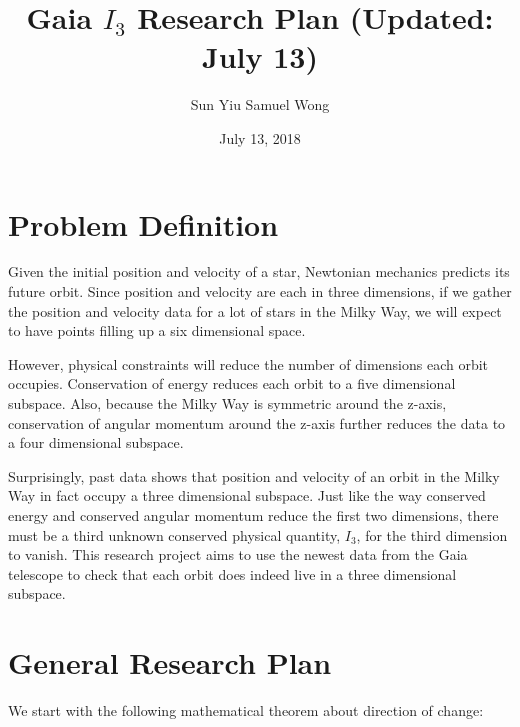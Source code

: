 \documentclass[12pt]{article}
\begin{document}
\title{Gaia $I_3$ Research Plan (Updated: July 13)}
\author{Sun Yiu Samuel Wong}
\date{July 13, 2018}
\maketitle

\newtheorem{theorem}{Theorem}
\newtheorem{assumption}{Assumption}
\newtheorem*{hypothesis}{Hypothesis}

\section{Problem Definition}
Given the initial position and velocity of a star, Newtonian mechanics predicts its future orbit. Since position and velocity are each in three dimensions, if we gather the position and velocity data for a lot of stars in the Milky Way, we will expect to have points filling up a six dimensional space.

However, physical constraints will reduce the number of dimensions each orbit occupies. Conservation of energy reduces each orbit to a five dimensional subspace. Also, because the Milky Way is symmetric around the z-axis, conservation of angular momentum around the z-axis further reduces the data to a four dimensional subspace.

Surprisingly, past data shows that position and velocity of an orbit in the Milky Way in fact occupy a three dimensional subspace. Just like the way conserved energy and conserved angular momentum reduce the first two dimensions, there must be a third unknown conserved physical quantity, $I_3$, for the third dimension to vanish. This research project aims to use the newest data from the Gaia telescope to check that each orbit does indeed live in a three dimensional subspace.

\section{General Research Plan}
We start with the following mathematical theorem about direction of change: 
\end{document}
